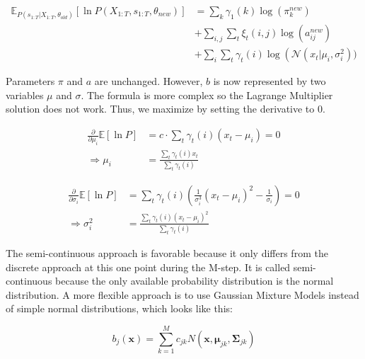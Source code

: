 \begin{equation}
\begin{aligned}
\mathbb{E}_{P\left(s_{1: T} | X_{1: T}, \theta_{o l d}\right)}\left[\ln P\left(X_{1: T}, s_{1: T}, \theta_{n e w}\right)\right] &=\sum_{k} \gamma_{1}(k) \log \left(\pi_{k}^{n e w}\right) \\
&+\sum_{i, j} \sum_{t} \xi_{t}(i, j) \log \left(a_{i j}^{n e w}\right) \\
&+\sum_{i} \sum_{t} \gamma_{t}(i)    \log \left(\mathcal{N}\left(x_{t} | \mu_{i}, \sigma_{i}^{2}\right)\right.  )
\end{aligned}
\end{equation}

Parameters $\pi$ and $a$ are unchanged. However, $b$ is now represented by two variables $\mu$ and $\sigma$. The formula is more complex so the Lagrange Multiplier solution does not work. Thus, we maximize by setting the derivative to 0. 

\begin{equation}
\begin{aligned}
\frac{\partial}{\partial \mu_i} \mathbb{E}[\ln P] &= c \cdot \sum_t \gamma_t(i) (x_t - \mu_i) = 0 \\
\Rightarrow \mu_i &= \frac{\sum_t \gamma_t(i)x_t}{\sum_t \gamma_t(i)}
\end{aligned}
\label{eq:mu-def}
\end{equation}

\begin{equation}
\begin{aligned}
\frac{\partial}{\partial \sigma_i} \mathbb{E}[\ln P] &= \sum_t \gamma_t(i) (\frac{1}{\sigma_i^3}(x_t-\mu_i)^2 - \frac{1}{\sigma_i}) = 0 \\
\Rightarrow \sigma_i^2 &= \frac{\sum_t \gamma_t(i)(x_t - \mu_i)^2}{\sum_t \gamma_t(i)}
\end{aligned}
\label{eq:sigma-def}
\end{equation}

The semi-continuous approach is favorable because it only differs from the discrete approach at this one point during the M-step. It is called semi-continuous because the only available probability distribution is the normal distribution. A more flexible approach is to use Gaussian Mixture Models instead of simple normal distributions, which looks like this: 

\begin{equation}
  b_{j}(\mathbf{x})=\sum_{k=1}^{M} c_{j k} N\left(\mathbf{x}, \boldsymbol{\mu}_{j k}, \boldsymbol{\Sigma}_{j k}\right) 
\end{equation}

